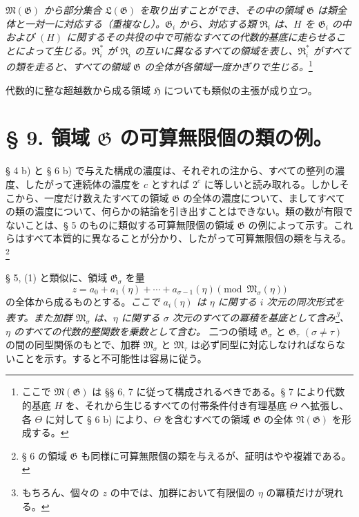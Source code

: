\documentclass[11pt]{article}
\begin{document}
\emph{$\mathfrak M(\mathfrak G)$ から部分集合 $\mathfrak L(\mathfrak G)$ を取り出すことができ、その中の領域 $\mathfrak G$ は類全体と一対一に対応する（重複なし）。$\mathfrak G_i$ から、対応する類 $\mathfrak R_i$ は、$H$ を $\mathfrak G_i$ の中および $(H)$ に関するその共役の中で可能なすべての代数的基底に走らせることによって生じる。$\mathfrak R_i^*$ が $\mathfrak R_i$ の互いに異なるすべての領域を表し、$\mathfrak R_i^*$ がすべての類を走ると、すべての領域 $\mathfrak G$ の全体が各領域一度かぎりで生じる。}\footnote{ここで $\mathfrak M(\mathfrak G)$ は §§ 6, 7 に従って構成されるべきである。§ 7 により代数的基底 $H$ を、それから生じるすべての付帯条件付き有理基底 $\Theta$ へ拡張し、各 $\Theta$ に対して § 6 b) により、$\Theta$ を含むすべての領域 $\mathfrak G$ の全体 $\mathfrak N(\mathfrak G)$ を形成する。}

代数的に整な超越数から成る領域 $\mathfrak H$ についても類似の主張が成り立つ。

\section*{§ 9. 領域 $\mathfrak G$ の可算無限個の類の例。}

§ 4 b) と § 6 b) で与えた構成の濃度は、それぞれの注から、すべての整列の濃度、したがって連続体の濃度を $c$ とすれば $2^c$ に等しいと読み取れる。しかしそこから、一度だけ数えたすべての領域 $\mathfrak G$ の全体の濃度について、ましてすべての類の濃度について、何らかの結論を引き出すことはできない。類の数が有限でないことは、§ 5 のものに類似する可算無限個の領域 $\mathfrak G$ の例によって示す。これらはすべて本質的に異なることが分かり、したがって可算無限個の類を与える。\footnote{§ 6 の領域 $\mathfrak G$ も同様に可算無限個の類を与えるが、証明はやや複雑である。}

§ 5, (1) と類似に、領域 $\mathfrak G_\sigma$ を量
\begin{equation}
 z=a_0+a_1(\eta)+\cdots+a_{\sigma-1}(\eta)
 \pmod{\mathfrak M_\sigma(\eta)}
\tag{1}
\end{equation}
の全体から成るものとする。\emph{ここで $a_i(\eta)$ は $\eta$ に関する $i$ 次元の同次形式を表す。また加群 $\mathfrak M_\sigma$ は、$\eta$ に関する $\sigma$ 次元のすべての冪積を基底として含み\footnote{もちろん、個々の $z$ の中では、加群において有限個の $\eta$ の冪積だけが現れる。}、$\eta$ のすべての代数的整関数を乗数として含む。} 二つの領域 $\mathfrak G_\sigma$ と $\mathfrak G_\tau$ $(\sigma\ne\tau)$ の間の同型関係のもとで、加群 $\mathfrak M_\sigma$ と $\mathfrak M_\tau$ は必ず同型に対応しなければならないことを示す。すると不可能性は容易に従う。
\end{document}
